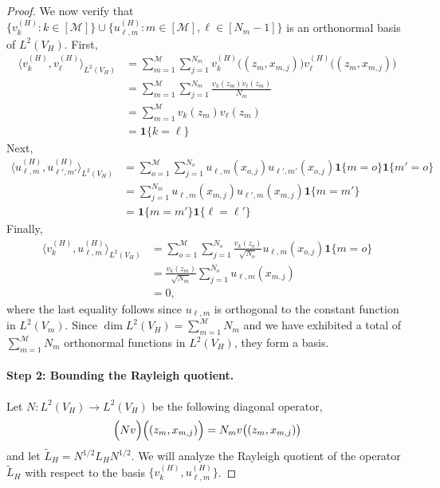 \documentclass{article}
\newcommand{\1}{\mathbf{1}}
\newcommand{\dotp}[2]{\langle #1, #2 \rangle}
\newcommand{\wt}[1]{\widetilde{#1}}
\newcommand{\mc}[1]{\mathcal{#1}}
\theoremstyle{alden}
\theoremstyle{aldenthm}
\theoremstyle{definition}
\theoremstyle{remark}
\begin{document}
\begin{proof}
We now verify that $\{v_k^{(H)}: k \in [\mc{M}]\} \cup \{u_{\ell,m}^{(H)}: m \in [\mc{M}], \ell \in [N_m - 1] \}$ is an orthonormal basis of $L^2(V_H)$. First,
\begin{align*}
\dotp{v_k^{(H)}}{v_{\ell}^{(H)}}_{L^2(V_H)} & = \sum_{m = 1}^{\mc{M}} \sum_{j = 1}^{N_m} v_k^{(H)}\bigl((z_m,x_{m,j})\bigr) v_{\ell}^{(H)}\bigl((z_m,x_{m,j})\bigr) \\
& = \sum_{m = 1}^{\mc{M}} \sum_{j = 1}^{N_m} \frac{v_k(z_m) v_{\ell}(z_m)}{N_m} \\
& = \sum_{m = 1}^{\mc{M}} v_k(z_m) v_{\ell}(z_m) \\
& = \1\{k = \ell\}
\end{align*} 
Next,
\begin{align*}
\dotp{u_{\ell,m}^{(H)}}{u_{\ell',m'}^{(H)}}_{L^2(V_H)} & = \sum_{o = 1}^{\mc{M}} \sum_{j = 1}^{N_o} u_{\ell,m}(x_{o,j}) u_{\ell',m'}(x_{o,j}) \1\{m = o\} \1\{m' = o\} \\
& = \sum_{j = 1}^{N_m} u_{\ell,m}(x_{m,j}) u_{\ell',m}(x_{m,j}) \1\{m = m'\} \\
& = \1\{m = m'\} \1\{\ell = \ell'\}
\end{align*}
Finally,
\begin{align*}
\dotp{v_k^{(H)}}{u_{\ell,m}^{(H)}}_{L^2(V_H)} & = \sum_{o = 1}^{\mc{M}} \sum_{j = 1}^{N_o} \frac{v_k(z_o)}{\sqrt{N_o}} u_{\ell,m}(x_{o,j}) \1\{m = o\} \\
& = \frac{v_k(z_m)}{\sqrt{N_m}} \sum_{j = 1}^{N_o} u_{\ell,m}(x_{m,j}) \\
& = 0,
\end{align*}
where the last equality follows since $u_{\ell,m}$ is orthogonal to the constant function in $L^2(V_m)$. Since $\dim L^2(V_H) = \sum_{m = 1}^{\mc{M}} N_m$ and we have exhibited a total of $\sum_{m = 1}^{\mc{M}} N_m$ orthonormal functions in $L^2(V_H)$, they form a basis.

\paragraph{Step 2: Bounding the Rayleigh quotient.}

Let $N: L^2(V_H) \to L^2(V_H)$ be the following diagonal operator,
\begin{equation*}
\Bigl(N v\Bigr) \Bigl((z_m,x_{m,j})\Bigr) = N_m v\bigl((z_m,x_{m,j})\bigr)
\end{equation*}
and let $\wt{L}_H = N^{1/2} L_H N^{1/2}$. We will analyze the Rayleigh quotient of the operator $\wt{L}_H$ with respect to the basis $\bigl\{v_k^{(H)}, u_{\ell,m}^{(H)}\bigr\}$. 


\end{proof}
\end{document}
